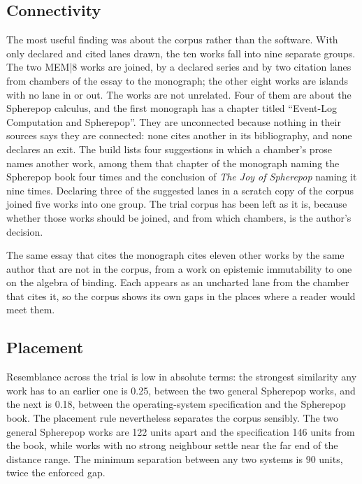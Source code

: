 \documentclass[11pt]{article}
\theoremstyle{remark}
\begin{document}
\subsection{Connectivity}

The most useful finding was about the corpus rather than the software. With only declared and cited lanes drawn, the ten works fall into nine separate groups. The two MEM|8 works are joined, by a declared series and by two citation lanes from chambers of the essay to the monograph; the other eight works are islands with no lane in or out. The works are not unrelated. Four of them are about the Spherepop calculus, and the first monograph has a chapter titled ``Event-Log Computation and Spherepop''. They are unconnected because nothing in their sources says they are connected: none cites another in its bibliography, and none declares an exit. The build lists four suggestions in which a chamber's prose names another work, among them that chapter of the monograph naming the Spherepop book four times and the conclusion of \emph{The Joy of Spherepop} naming it nine times. Declaring three of the suggested lanes in a scratch copy of the corpus joined five works into one group. The trial corpus has been left as it is, because whether those works should be joined, and from which chambers, is the author's decision.

The same essay that cites the monograph cites eleven other works by the same author that are not in the corpus, from a work on epistemic immutability to one on the algebra of binding. Each appears as an uncharted lane from the chamber that cites it, so the corpus shows its own gaps in the places where a reader would meet them.

\subsection{Placement}

Resemblance across the trial is low in absolute terms: the strongest similarity any work has to an earlier one is 0.25, between the two general Spherepop works, and the next is 0.18, between the operating-system specification and the Spherepop book. The placement rule nevertheless separates the corpus sensibly. The two general Spherepop works are 122 units apart and the specification 146 units from the book, while works with no strong neighbour settle near the far end of the distance range. The minimum separation between any two systems is 90 units, twice the enforced gap.
\end{document}
